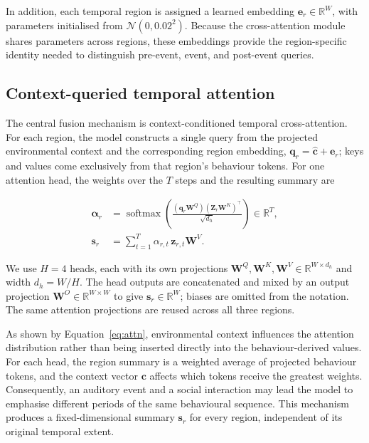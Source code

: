 \documentclass[11pt]{article}
\newcommand{\R}{\mathbb{R}}
\newcommand{\vc}{\mathbf{c}}
\newcommand{\vchat}{\hat{\mathbf{c}}}
\newcommand{\ve}{\mathbf{e}}
\newcommand{\vq}{\mathbf{q}}
\newcommand{\vs}{\mathbf{s}}
\newcommand{\mZ}{\mathbf{Z}}
\newcommand{\mW}{\mathbf{W}}
\newcommand{\softmax}{\operatorname{softmax}}
\begin{document}
In addition, each temporal region is assigned a learned embedding $\ve_r\in\R^W$, with parameters initialised from $\mathcal{N}(0,0.02^2)$. Because the cross-attention module shares parameters across regions, these embeddings provide the region-specific identity needed to distinguish pre-event, event, and post-event queries.

\subsection{Context-queried temporal attention}
\label{sec:cross-attention}

The central fusion mechanism is context-conditioned temporal cross-attention. For each region, the model constructs a single query from the projected environmental context and the corresponding region embedding, $\vq_r = \vchat + \ve_r$; keys and values come exclusively from that region's behaviour tokens. For one attention head, the weights over the $T$ steps and the resulting summary are

\begin{equation}
  \begin{aligned}
    \bm{\alpha}_r &= \softmax\!\left(\frac{(\vq_r\mW^{Q})(\mZ_r\mW^{K})^{\top}}{\sqrt{d_h}}\right)\in\R^{T},\\
    \vs_r &= \sum_{t=1}^{T}\alpha_{r,t}\,\mathbf{z}_{r,t}\mW^{V}.
  \end{aligned}
  \label{eq:attn}
\end{equation}

We use $H=4$ heads, each with its own projections $\mW^{Q},\mW^{K},\mW^{V}\in\R^{W\times d_h}$ and width $d_h=W/H$. The head outputs are concatenated and mixed by an output projection $\mW^{O}\in\R^{W\times W}$ to give $\vs_r\in\R^{W}$; biases are omitted from the notation. The same attention projections are reused across all three regions.

As shown by Equation~\eqref{eq:attn}, environmental context influences the attention distribution rather than being inserted directly into the behaviour-derived values. For each head, the region summary is a weighted average of projected behaviour tokens, and the context vector $\vc$ affects which tokens receive the greatest weights. Consequently, an auditory event and a social interaction may lead the model to emphasise different periods of the same behavioural sequence. This mechanism produces a fixed-dimensional summary $\vs_r$ for every region, independent of its original temporal extent.
\end{document}
